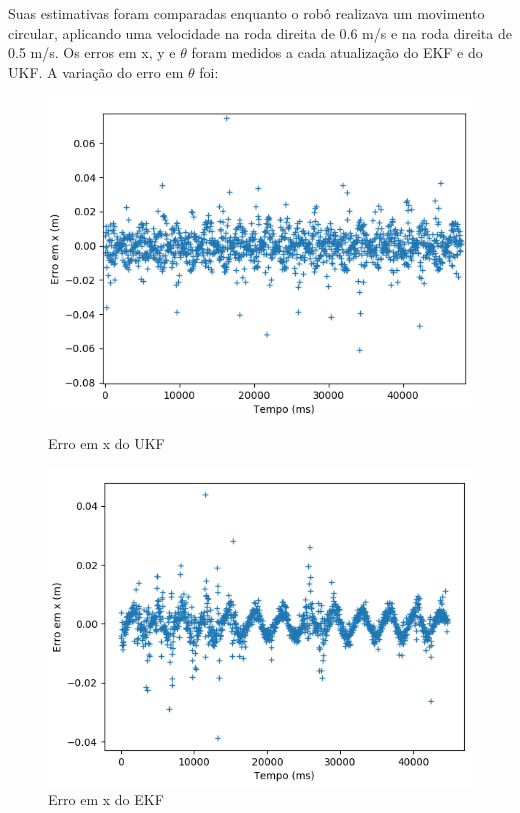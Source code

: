 \documentclass[
	12pt,				%
	openright,			%
	twoside,			%
	convert,
	a4paper,			%
	english,			%
	french,				%
	spanish,			%
	brazil				%
	]{abntex2}
\begin{document}
\par
Suas estimativas foram comparadas enquanto o robô realizava um movimento circular, aplicando uma velocidade na roda direita de 0.6 m/s e na roda direita de 0.5 m/s. Os erros em x, y e $\theta$ foram medidos a cada atualização do EKF e do UKF. A variação do erro em $\theta$ foi:
\begin{figure}[H]
  \centering
  \begin{minipage}[b]{0.45\textwidth}
    \includegraphics[width=\textwidth]{ukf_x}
    \caption{Erro em x do UKF}
  \end{minipage}
  \begin{minipage}[b]{0.45\textwidth}
    \includegraphics[width=\textwidth]{ekf_x}
    \caption{Erro em x do EKF}
  \end{minipage}
\end{figure}
\end{document}
